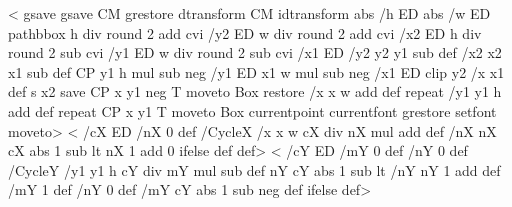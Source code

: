 <%
  gsave
    gsave \tx@STV CM grestore dtransform CM idtransform
    abs /h ED abs /w ED
    pathbbox
    h div round 2 add cvi /y2 ED
    w div round 2 add cvi /x2 ED
    h div round 2 sub cvi /y1 ED
    w div round 2 sub cvi /x1 ED
    /y2 y2 y1 sub def
    /x2 x2 x1 sub def
    CP
    y1 h mul sub neg /y1 ED
    x1 w mul sub neg /x1 ED
    clip
    y2 {
      /x x1 def
      s
      x2 {
        save CP x y1
        \ifx\VTeXversion\undefined
        \else
        neg
        \fi
T moveto Box restore
        /x x w add def
      } repeat
      /y1 y1 h add def
    } repeat
    CP x y1 T moveto Box
  currentpoint currentfont grestore setfont moveto>
\else
<%
  /cX ED
  /nX 0 def
  /CycleX {
    /x x w cX div nX mul add def
    /nX nX cX abs 1 sub lt { nX 1 add } { 0 } ifelse def
  } def>
<%
  /cY ED
  /mY 0 def
  /nY 0 def
  /CycleY {
    /y1 y1 h cY div mY mul sub def
    nY cY abs 1 sub lt { /nY nY 1 add def /mY 1 def }
                       { /nY 0 def        /mY cY abs 1 sub neg def } ifelse
  } def>

